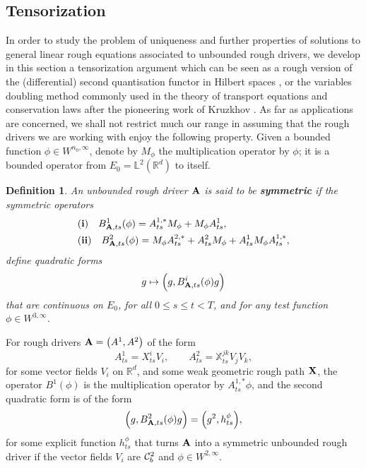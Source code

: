 \documentclass[11pt,a4paper]{amsart}
\newcommand{\RR}{\mathbb{R}}  \newcommand{\CC}{\mathbb{C}}  \newcommand{\LL}{\mathbb{L}}  \newcommand{\WW}{\mathbb{W}}
\newcommand{\bbX}{\mathbb{X}}
\renewcommand{\leq}{\leqslant}
\newtheorem{defn}[thm]{ \hspace{-0.3cm} {\sc Definition}}%
\numberwithin{equation}{section} %
\begin{document}
\bigskip


\subsection{Tensorization}
\label{SubsectionTensorization}

In order to study the problem of uniqueness and further properties of solutions to general linear rough equations associated to unbounded rough drivers, we develop in this section a tensorization argument which can be seen as a rough version of the (differential) second quantisation functor in Hilbert spaces \cite{ReedSimon}, or the variables doubling method commonly used in the theory of transport equations and conservation laws after the pioneering work of Kruzkhov \cite{Kruzkhov}. As far as applications are concerned, we shall not restrict much our range in assuming that the rough drivers we are working with enjoy the following property. Given a bounded function $\phi\in W^{n_0,\infty}$, denote by $M_\phi$ the multiplication operator by $\phi$; it is a bounded operator from $E_0 = \LL^2(\RR^d)$ to itself.

\begin{defn}
\label{DefnSymmetricDriver}
An unbounded rough driver $\bf A$ is said to be \textbf{\emph{symmetric}} if the symmetric operators 
\begin{equation*}
\begin{split}
&{\bf (i)}\quad B^1_{{\bf A},ts}(\phi) = A^{1,*}_{ts}M_\phi  + M_\phi A^1_{ts} , \\
&{\bf (ii)}\quad B^2_{{\bf A},ts}(\phi) = M_\phi A^{2,*}_{ts}  +  A^2_{ts}M_\phi + A_{ts}^1 M_\phi A^{1,*}_{ts},
\end{split}
\end{equation*}
define quadratic forms 
$$
g\mapsto \Big(g,B^i_{{\bf A},ts}(\phi)g\Big)
$$
that are continuous on $E_0$, for all $0\leq s\leq t<T$, and for any test function $\phi\in W^{3,\infty}$.
\end{defn}

For rough drivers ${\bf A} = \big(A^1,A^2\big)$ of the form 
$$
A^1_{ts} = X^i_{ts} V_i, \quad\quad A^2_{ts} = {\bbX}^{jk}_{ts} V_jV_k,
$$
for some vector fields $V_i$ on $\RR^d$, and some weak geometric rough path ${\bf X}$, the operator $B^1(\phi)$ is the multiplication operator by $A^{1,*}_{ts}\phi$, and the second quadratic form is of the form
$$
\Big(g,B^2_{{\bf A},ts}(\phi)g\Big) = \Big(g^2 , h^\phi_{ts}\Big),
$$
for some explicit function $h^\phi_{ts}$ that turns $\bf A$ into a symmetric unbounded rough driver if the vector fields $V_i$ are $\mathcal{C}^2_b$ and $\phi\in W^{2,\infty}$. 
\end{document}
